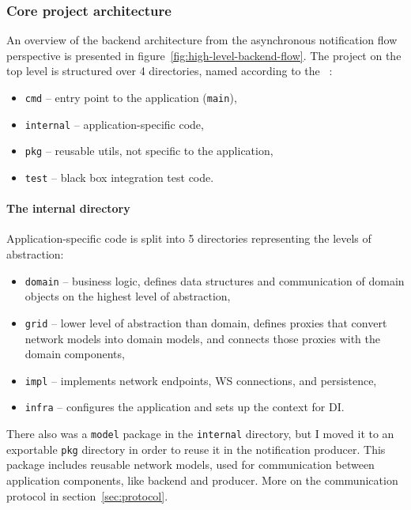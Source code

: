 \subsubsection{Core project architecture}\label{sec:core-project-architecture}

An overview of the backend architecture
from the asynchronous notification flow perspective
is presented in figure~\ref{fig:high-level-backend-flow}.
The project on the top level is structured over 4 directories,
named according to
the ~\cite{quest_standard_2022}:

\begin{itemize}
  \item
        \texttt{cmd} -- entry point to the application (\texttt{main}),
  \item
        \texttt{internal} -- application-specific code,
  \item
        \texttt{pkg} -- reusable utils, not specific to the application,
  \item
        \texttt{test} -- black box integration test code.
\end{itemize}

\paragraph*{The internal directory}\label{sec:the-internal-directory}

Application-specific code is split into 5 directories
representing the levels of abstraction:

\begin{itemize}
  \item
        \texttt{domain} -- business logic,
        defines data structures and communication of domain objects
        on the highest level of abstraction,
  \item
        \texttt{grid} -- lower level of abstraction than domain,
        defines proxies that convert network models into domain models,
        and connects those proxies with the domain components,
  \item
        \texttt{impl} -- implements network endpoints,
        \ac{WS} connections, and persistence,
  \item
        \texttt{infra} -- configures the application
        and sets up the context for \ac{DI}.
\end{itemize}

There also was a \texttt{model} package
in the \texttt{internal} directory,
but I moved it to an exportable \texttt{pkg} directory
in order to reuse it in the notification producer.
This package includes reusable network models,
used for communication between application components,
like backend and producer.
More on the communication protocol in section~\ref{sec:protocol}.

